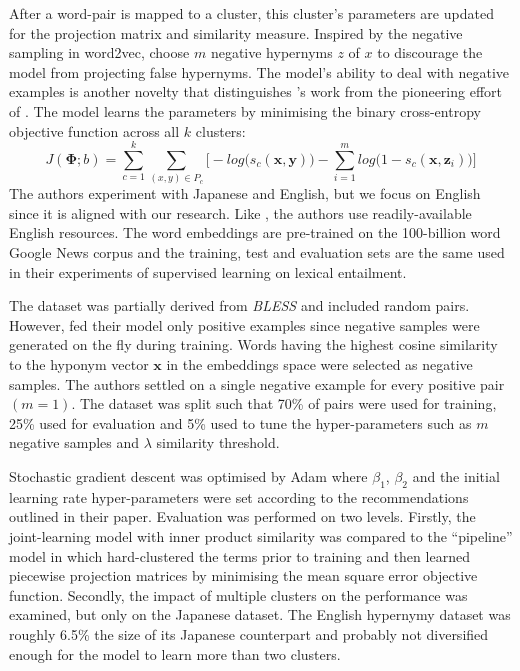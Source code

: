 After a word-pair is mapped to a cluster, this cluster’s parameters are updated for the projection matrix and similarity measure.  Inspired by the negative sampling in word2vec, \citeauthor{yamane2016distributional} choose $m$ negative hypernyms $z$ of $x$ to discourage the model from projecting false hypernyms. The model’s ability to deal with negative examples is another novelty that distinguishes \citeauthor{yamane2016distributional}'s work from the pioneering effort of \citep{Fu2014}. The model learns the parameters by minimising the binary cross-entropy objective function across all $k$ clusters:
\[J(\bm{\Phi}; b) = \sum_{c=1}^{k} \sum_{(x,y) \in P_c} \Big[ -log \big(s_c(\bm{x}, \bm{y}) \big) - \sum_{i=1}^{m} log \big(1 - s_c(\bm{x}, \bm{z}_i) \big) \Big]\]
The authors experiment with Japanese and English, but we focus on English since it is aligned with our research.  Like \citep{ustalov2017negative}, the authors use readily-available English resources.  The word embeddings are pre-trained on the 100-billion word Google News corpus \citep{mikolov2013efficient} and the training, test and evaluation sets are the same \citet{baroni2012entailment} used in their experiments of supervised learning on lexical entailment.

The \citet{baroni2012entailment} dataset was partially derived from \textit{BLESS} \citep{Baroni2011} and included random pairs.  However, \citeauthor{yamane2016distributional} fed their model only positive examples since negative samples were generated on the fly during training.  Words having the highest cosine similarity to the hyponym vector $\bm{x}$ in the embeddings space were selected as negative samples.  The authors settled on a single negative example for every positive pair $(m=1)$.  The dataset was split such that 70\% of pairs were used for training, 25\% used for evaluation and 5\% used to tune the hyper-parameters such as $m$ negative samples and $\lambda$ similarity threshold.

Stochastic gradient descent was optimised by Adam \citep{kingma2014adam} where $\beta_1$, $\beta_2$ and the initial learning rate hyper-parameters were set according to the recommendations outlined in their paper.  Evaluation was performed on two levels.  Firstly, the joint-learning model with inner product similarity was compared to the “pipeline” model in \citep{Fu2014} which hard-clustered the terms prior to training and then learned piecewise projection matrices by minimising the mean square error objective function.  Secondly, the impact of multiple clusters on the performance was examined, but only on the Japanese dataset.  The English hypernymy dataset was roughly 6.5\% the size of its Japanese counterpart and probably not diversified enough for the model to learn more than two clusters. 

